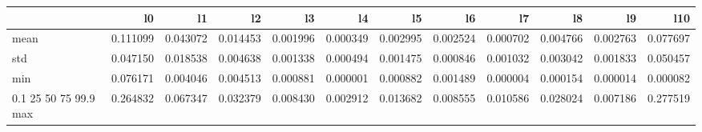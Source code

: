 \begin{tabular}{lrrrrrrrrrrr}
\toprule
 & l0 & l1 & l2 & l3 & l4 & l5 & l6 & l7 & l8 & l9 & l10 \\
\midrule
mean & 0.111099 & 0.043072 & 0.014453 & 0.001996 & 0.000349 & 0.002995 & 0.002524 & 0.000702 & 0.004766 & 0.002763 & 0.077697 \\
std & 0.047150 & 0.018538 & 0.004638 & 0.001338 & 0.000494 & 0.001475 & 0.000846 & 0.001032 & 0.003042 & 0.001833 & 0.050457 \\
min & 0.076171 & 0.004046 & 0.004513 & 0.000881 & 0.000001 & 0.000882 & 0.001489 & 0.000004 & 0.000154 & 0.000014 & 0.000082 \\
0.1%
25%
50%
75%
99.9%
max & 0.264832 & 0.067347 & 0.032379 & 0.008430 & 0.002912 & 0.013682 & 0.008555 & 0.010586 & 0.028024 & 0.007186 & 0.277519 \\
\bottomrule
\end{tabular}
